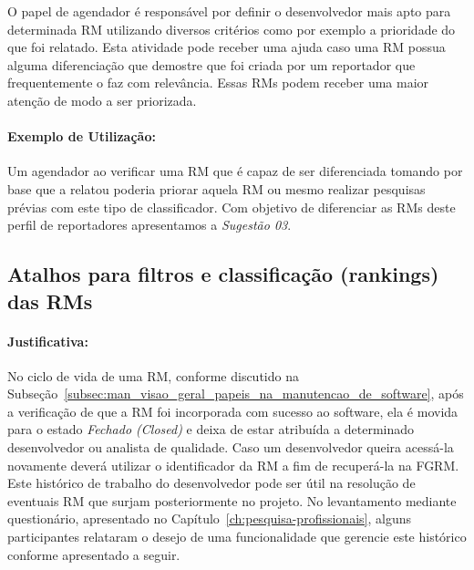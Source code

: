 O papel de agendador é responsável por definir o desenvolvedor mais apto
para determinada RM utilizando diversos critérios como por exemplo a prioridade
do que foi relatado. Esta atividade pode receber uma ajuda caso uma RM possua
alguma diferenciação que demostre que foi criada por um reportador que
frequentemente o faz com relevância. Essas RMs podem receber uma maior atenção
de modo a ser priorizada.

\paragraph{Exemplo de Utilização:}
\label{par:exemplo_de_utilização_s03}

Um agendador ao verificar uma RM que é capaz de ser diferenciada tomando por
base que a relatou poderia priorar aquela RM ou mesmo realizar pesquisas prévias
com este tipo de classificador. Com objetivo de diferenciar as RMs deste perfil
de reportadores apresentamos a \textit{Sugestão 03}.

\subsection{Atalhos para filtros e classificação (rankings) das RMs}
\label{sub:histórico_das_ùltimas_rm_s}


\paragraph{Justificativa:}
\label{par:justificativa_s04}

No ciclo de vida de uma RM, conforme discutido na
Subseção~\ref{subsec:man_visao_geral_papeis_na_manutencao_de_software}, após a
verificação de que a RM foi incorporada com sucesso ao software, ela é movida
para o estado \textit{Fechado (Closed)} e deixa de estar atribuída a determinado
desenvolvedor ou analista de qualidade. Caso um desenvolvedor queira acessá-la
novamente deverá utilizar o identificador da RM a fim de recuperá-la na FGRM\@.
Este histórico de trabalho do desenvolvedor pode ser útil na resolução de
eventuais RM que surjam posteriormente no projeto. No levantamento mediante
questionário, apresentado no Capítulo~\ref{ch:pesquisa-profissionais}, alguns
participantes relataram o desejo de uma funcionalidade  que gerencie este
histórico conforme apresentado a seguir.

